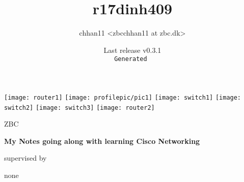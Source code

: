
\title{r17dinh409}
\def\thesubject{My Notes going along with learning Cisco Networking}
\def\theinstitution{ZBC}

\author{chhan11 <zbcchhan11 at zbc.dk>}
\def\thesupervisor{none}

\def\theversion{v0.3.1}
\date{{\footnotesize Last release \theversion\\%
    \texttt{\color{Gray}Generated \utccurrenttime}}}

\begin{titlepage}
    \centering
    \texttt{[image: router1]}
    \texttt{[image: profilepic/pic1]}
    \texttt{[image: switch1]}
    \texttt{[image: switch2]}
    \texttt{[image: switch3]}
    \texttt{[image: router2]}\par\vspace{1cm}
    {\scshape\LARGE \theinstitution\par}
    \vspace{1cm}
    {\scshape\Large \thetitle\par}
    \vspace{1.5cm}
    {\huge\bfseries \thesubject\par}
    \vspace{2cm}
    {\Large\itshape \theauthor\par}
    \vfill
    supervised by\par
    \thesupervisor
    
    \vfill
    
    {\large \thedate\par}
\end{titlepage}
